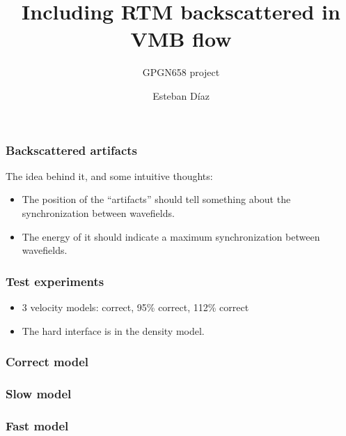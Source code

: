 

\title[]{Including RTM backscattered in VMB flow}
\subtitle{GPGN658 project }
\author[]{Esteban  D\'{i}az}
\date{}
\logo{}

\def\big#1{\begin{center} \LARGE \textbf{#1} \end{center}}
\def\cen#1{\begin{center}        \textbf{#1} \end{center}}

 { \cwpcover }

\begin{frame} \frametitle{Backscattered artifacts}
The idea behind it, and some intuitive thoughts:

\begin{itemize}
   \item The position of the ``artifacts'' should tell 
   something about the synchronization between wavefields.
   \item The energy of it should indicate a maximum synchronization 
   between wavefields.
\end{itemize}

\end{frame}
\cwpnote{}

\begin{frame} \frametitle{Test experiments}

\begin{itemize}
   \item 3 velocity models: correct, 95\% correct, 112\% correct
   \item The hard interface is in the density model. 
\end{itemize}

\end{frame}
\cwpnote{}

\begin{frame} \frametitle{Correct model}  \end{frame}
\begin{frame} \frametitle{Slow    model}  \end{frame}
\begin{frame} \frametitle{Fast    model}  \end{frame}

